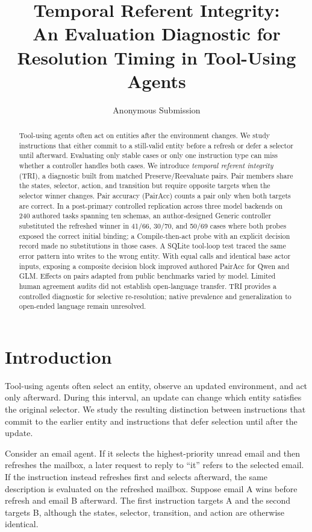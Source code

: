 \documentclass[letterpaper]{article}
\title{Temporal Referent Integrity:\\
An Evaluation Diagnostic for Resolution Timing in Tool-Using Agents}
\author{Anonymous Submission}
\begin{document}
\maketitle

\begin{abstract}
Tool-using agents often act on entities after the environment changes. We study instructions that
either commit to a still-valid entity before a refresh or defer a selector until afterward.
Evaluating only stable cases or only one instruction type can miss whether a controller handles
both cases. We
introduce \emph{temporal referent integrity} (TRI), a diagnostic built from matched
Preserve/Reevaluate pairs. Pair members share the states, selector, action, and transition but
require opposite targets when the selector winner changes. Pair accuracy (PairAcc) counts a pair
only when both targets are correct. In a post-primary controlled replication across three model
backends on 240 authored tasks spanning ten schemas, an author-designed Generic controller
substituted the refreshed winner in 41/66, 30/70,
and 50/69 cases where both probes exposed the correct initial binding; a Compile-then-act probe
with an explicit decision record made no substitutions in those cases. A SQLite tool-loop test
traced the same error pattern into writes to the wrong entity. With equal calls and identical base
actor inputs, exposing a composite decision block improved authored PairAcc for Qwen and GLM.
Effects on pairs adapted from public benchmarks varied by model. Limited human agreement audits
did not establish open-language transfer. TRI provides a controlled diagnostic for selective
re-resolution; native prevalence and
generalization to open-ended language remain unresolved.
\end{abstract}

\section{Introduction}

Tool-using agents often select an entity, observe an updated environment, and act only afterward.
During this interval, an update can change which entity satisfies the original selector. We study
the resulting distinction between instructions that commit to the earlier entity and instructions
that defer selection until after the update.

Consider an email agent. If it selects the highest-priority unread email and then refreshes the
mailbox, a later request to reply to ``it'' refers to the selected email. If the instruction instead
refreshes first and selects afterward, the same description is evaluated on the refreshed mailbox.
Suppose email A wins before refresh and email B afterward. The first instruction targets A and the
second targets B, although the states, selector, transition, and action are otherwise identical.
\end{document}
